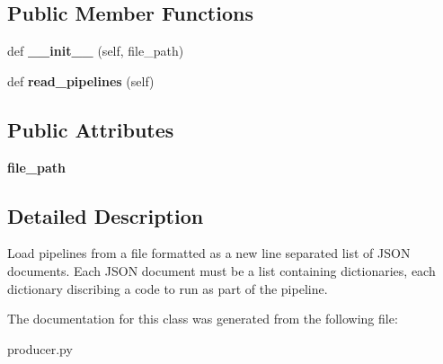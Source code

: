 \subsection*{Public Member Functions}
\begin{DoxyCompactItemize}
\item 
\mbox{\label{classcodar_1_1savanna_1_1producer_1_1_j_s_o_n_file_pipeline_reader_a55313d819000a60b4c1d0acc6723722b}} 
def {\bfseries \+\_\+\+\_\+init\+\_\+\+\_\+} (self, file\+\_\+path)
\item 
\mbox{\label{classcodar_1_1savanna_1_1producer_1_1_j_s_o_n_file_pipeline_reader_a1b4cf622fdd2146181d5776f044c97c6}} 
def {\bfseries read\+\_\+pipelines} (self)
\end{DoxyCompactItemize}
\subsection*{Public Attributes}
\begin{DoxyCompactItemize}
\item 
\mbox{\label{classcodar_1_1savanna_1_1producer_1_1_j_s_o_n_file_pipeline_reader_a492f862e3d8692400cc29b11df5cf137}} 
{\bfseries file\+\_\+path}
\end{DoxyCompactItemize}


\subsection{Detailed Description}
\begin{DoxyVerb}Load pipelines from a file formatted as a new line separated list of
JSON documents. Each JSON document must be a list containing dictionaries,
each dictionary discribing a code to run as part of the pipeline.\end{DoxyVerb}
 

The documentation for this class was generated from the following file\+:\begin{DoxyCompactItemize}
\item 
producer.\+py\end{DoxyCompactItemize}
